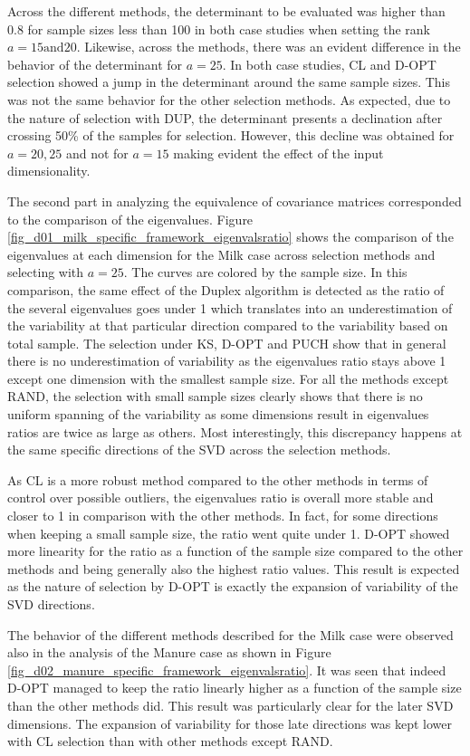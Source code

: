 \documentclass[journal=ancham,manuscript=article]{achemso}
\begin{document}
Across the different methods, the determinant to be evaluated was higher than 0.8 for sample sizes less than 100 in both case studies when setting the rank $a=15 \text{and} 20$. Likewise, across the methods, there was an evident difference in the behavior of the determinant for $a=25$. In both case studies, CL and D-OPT selection showed a jump in the determinant around the same sample sizes. This was not the same behavior for the other selection methods. As expected, due to the nature of selection with DUP, the determinant presents a declination after crossing 50\% of the samples for selection. However, this decline was obtained for $a=20, 25$ and not for $a=15$ making evident the effect of the input dimensionality.   

The second part in analyzing the equivalence of covariance matrices corresponded to the comparison of the eigenvalues. Figure \ref{fig_d01_milk_specific_framework_eigenvalsratio} shows the comparison of the eigenvalues at each dimension for the Milk case across selection methods and selecting with $a=25$. The curves are colored by the sample size. In this comparison, the same effect of the Duplex algorithm is detected as the ratio of the several eigenvalues goes under 1 which translates into an underestimation of the variability at that particular direction compared to the variability based on total sample.  The selection under KS, D-OPT and PUCH show that in general there is no underestimation of variability as the eigenvalues ratio stays above 1 except one dimension with the smallest sample size. For all the methods except RAND, the selection with small sample sizes clearly shows that there is no uniform spanning of the variability as some dimensions result in eigenvalues ratios are twice as large as others. Most interestingly, this discrepancy happens at the same specific directions of the SVD across the selection methods.

As CL is a more robust method compared to the other methods in terms of control over possible outliers, the eigenvalues ratio is overall more stable and closer to 1 in comparison with the other methods. In fact, for some directions when keeping a small sample size, the ratio went quite under 1. D-OPT showed more linearity for the ratio as a function of the sample size compared to the other methods and being generally also the highest ratio values. This result is expected as the nature of selection by D-OPT is exactly the expansion of variability of the SVD directions.  

The behavior of the different methods described for the Milk case were observed also in the analysis of the Manure case as shown in Figure \ref{fig_d02_manure_specific_framework_eigenvalsratio}. It was seen that indeed D-OPT managed to keep the ratio linearly higher as a function of the sample size than the other methods did. This result was particularly clear for the later SVD dimensions. The expansion of variability for those late directions was kept lower with CL selection than with other methods except RAND.  
\end{document}

